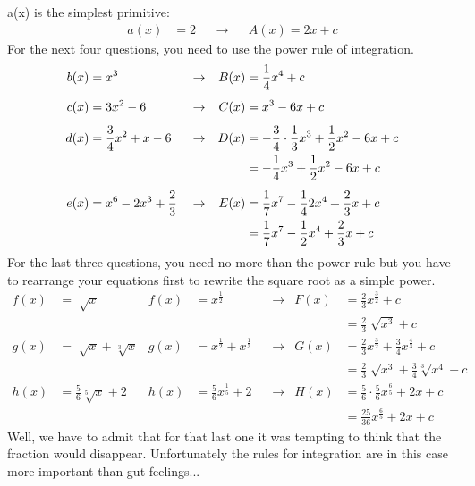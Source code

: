 \documentclass[a4paper]{report}
\begin{document}
\begin{Answer}[ref=ex3]
\noindent a(x) is the simplest primitive:
\begin{align*}
a(x) &= 2 & &\rightarrow& & A(x) = 2x + c
\end{align*}
For the next four questions, you need to use the power rule of integration.
\begin{align*}
b(x) &= x^3 & & \rightarrow & B(x)&=\frac{1}{4}x^4+c\\[1ex]
c(x) &= 3x^2-6 & &\rightarrow &C(x)&=x^3-6x+c\\[1ex]
d(x) &= \-\frac{3}{4}x^2+x-6 & & \rightarrow & D(x)&= -\frac{3}{4}\cdot \frac{1}{3}x^3+\frac{1}{2}x^2-6x+c\\
& & & & &=-\frac{1}{4}x^3+\frac{1}{2}x^2-6x+c\\[1ex]
e(x) &= x^6-2x^3+\frac{2}{3} & & \rightarrow & E(x)&=\frac{1}{7}x^7-\frac{1}{4}2x^4+\frac{2}{3}x+c\\
& & & & &=\frac{1}{7}x^7-\frac{1}{2}x^4+\frac{2}{3}x+c
\end{align*}
For the last three questions, you need no more than the power rule but you have to rearrange your equations first to rewrite the square root as a simple power. 
\begin{align*} 
f(x) &= \sqrt[]x & f(x)&= x^\frac{1}{2}& & \rightarrow & 
F(x)&=\frac{2}{3}x^\frac{3}{2}+c \\
& & & & & & &=\frac{2}{3}\sqrt[]{x^3}+c\\[1ex]
g(x) &= \sqrt[]x+ \sqrt[3]x & g(x)&= x^\frac{1}{2}+ x^\frac{1}{3}& & \rightarrow & G(x) &=\frac{2}{3}x^\frac{3}{2}+\frac{3}{4}x^\frac{4}{3}+c\\
& & & & & & &=\frac{2}{3}\sqrt[]{x^3}+\frac{3}{4}\sqrt[3]{x^4}+c\\[1ex]
 h(x) &=\frac{5}{6}\sqrt[5]{x}+2 & h(x) &=\frac{5}{6}x^\frac{1}{5}+2 & & \rightarrow & H(x)&=\frac{5}{6}\cdot \frac{5}{6}x^\frac{6}{5}+2x+c\\
& & & & & & &=\frac{25}{36}x^\frac{6}{5}+2x+c
\end{align*}
Well, we have to admit that for that last one it was tempting to think that the fraction would disappear. Unfortunately the rules for integration are in this case more important than gut feelings...
\end{Answer}
\end{document}
